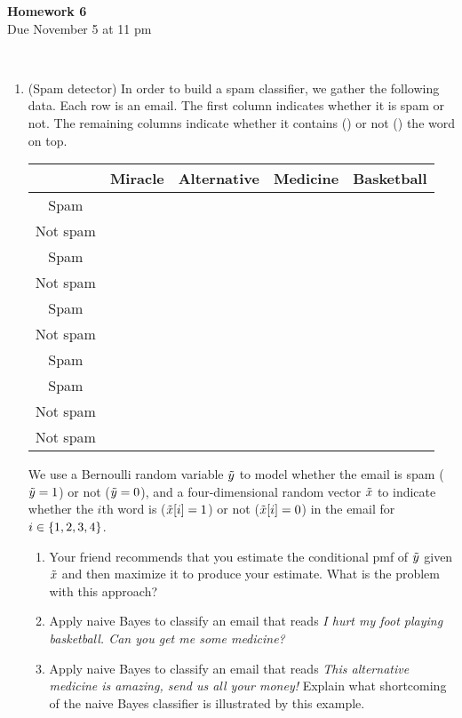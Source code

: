 \documentclass[12pt,twoside]{article}
\newcommand{\tick}{\ding{51}}%
\newcommand{\xmark}{\ding{55}}
\begin{document}
\begin{center}
{\large{\textbf{Homework 6}} } \vspace{0.2cm}\\
Due November 5 at 11 pm
\\
\end{center}
\\

\begin{enumerate}

\item (Spam detector) In order to build a spam classifier, we gather the following data. Each row is an email. The first column indicates whether it is spam or not. The remaining columns indicate whether it contains (\tick) or not (\xmark) the word on top.
\begin{center}
{\footnotesize
\begin{tabular}{ |c|c|c|c|c| } 
 \hline
 & Miracle  & Alternative & Medicine & Basketball \\
\hline 
Spam &  \tick  & \tick& \tick & \tick  \\
\hline
Not spam &  \xmark  & \xmark& \tick & \tick  \\
\hline 
Spam &  \tick  & \xmark& \xmark & \xmark  \\
\hline
Not spam &  \xmark  & \tick& \xmark & \xmark  \\
\hline
Spam &  \tick  & \xmark& \xmark & \xmark  \\
\hline
Not spam &  \xmark  & \tick& \xmark & \tick  \\
\hline 
Spam &  \tick  & \xmark& \xmark & \xmark  \\
\hline
Spam &  \xmark  & \tick& \tick & \xmark  \\
\hline
Not spam &  \tick  & \tick& \xmark & \tick  \\
\hline
Not spam &  \xmark  & \xmark& \tick & \tick  \\
\hline 
\end{tabular}
}
\end{center}
We use a Bernoulli random variable $\tilde{  y }$ to model whether the email is spam ($\tilde{  y }=1$) or not ($\tilde{  y }=0$), and a four-dimensional random vector $\tilde{  x }$ to indicate whether the $i$th word is  ($\tilde{  x }[i]=1$) or not ($\tilde{  x }[i]=0$) in the email for $i \in \left\{ 1,2,3,4 \right\}$.
\begin{enumerate}
\item  Your friend recommends that you estimate the conditional pmf of $\tilde{  y }$ given $\tilde{  x }$ and then maximize it to produce your estimate. What is the problem with this approach?
\item Apply naive Bayes to classify an email that reads \emph{I hurt my foot playing basketball. %
Can you get me some medicine?} 
\item Apply naive Bayes to classify an email that reads \emph{This alternative medicine is amazing, send us all your money!} Explain what shortcoming of the naive Bayes classifier is illustrated by this example.
\end{enumerate}


\end{enumerate}
\end{document}
